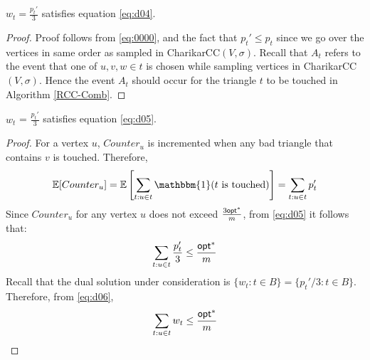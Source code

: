\begin{lemma} \label{RCC:l1}
$w_t = \frac{p_t'}{3}$ satisfies equation \eqref{eq:d04}.
\end{lemma}
\begin{proof}
Proof follows from \eqref{eq:0000}, and the fact that $p_t' \leq p_t$ since we go over the vertices in same order as sampled in {\sf CharikarCC}$(V,\sigma)$. Recall that $A_t$ refers to the event that one of $u,v,w \in t$ is chosen while sampling vertices in {\sf CharikarCC}$(V,\sigma)$. Hence the event $A_t$ should occur for the triangle $t$ to be touched in Algorithm \ref{RCC-Comb}.
\end{proof}

\begin{lemma}\label{RCC:l2}
$w_t$ = $\frac{p_t'}{3}$ satisfies equation \eqref{eq:d05}.
\end{lemma}
\begin{proof}
For a vertex $u$, $Counter_u$ is incremented when any bad triangle that contains $v$ is touched. Therefore,
\begin{equation*}
    \mathbb{E} [Counter_u] = \mathbb{E} \left[ \sum_{t : u \in t} \mathbbm{1} (t \text{ is touched}) \right] = \sum_{t : u \in t} p_t'
\end{equation*}
Since $Counter_u$ for any vertex $u$ does not exceed $\frac{3\mathsf{opt}^*}{m}$, from \eqref{eq:d05} it follows that:
\begin{equation} \label{eq:d06}
    \sum_{t : u \in t} \frac{p_t'}{3} \le \frac{ \mathsf{opt}^*}{m}
\end{equation}
Recall that the dual solution under consideration is $\{ w_t : t \in B\} = \{ p_t'/ 3 : t \in B\}$. Therefore, from \eqref{eq:d06},
\begin{equation*}
\sum_{t : u \in t} w_t \leq \frac{\mathsf{opt}^*}{m}
\end{equation*}
\end{proof}

